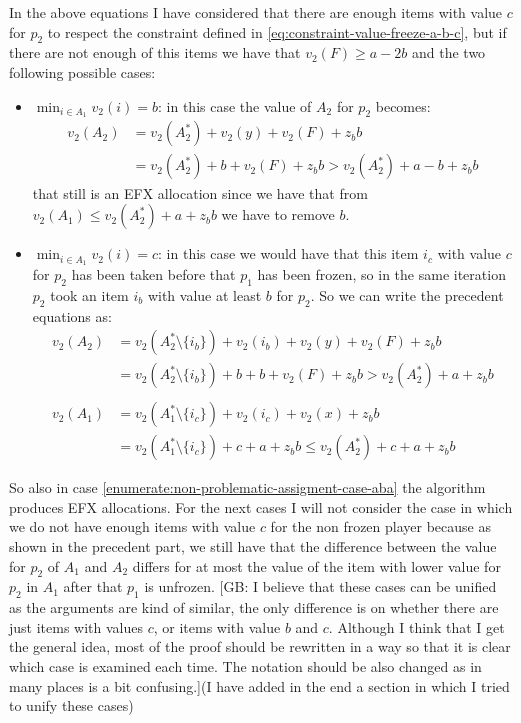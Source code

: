 \documentclass{article}
\newcommand{\gb}[1]{{\color{red}[GB: #1]}}
\begin{document}
In the above equations I have considered that there are enough items with value $c$ for $p_2$ to respect the constraint defined in \ref{eq:constraint-value-freeze-a-b-c}, but if there are not enough of this items we have that $v_2(F) \ge a-2b$ and the two following possible cases:
\begin{itemize}
        \item $\min_{i\in A_1} v_2(i) = b$: in this case the value of $A_2$ for $p_2$ becomes:
        \begin{align*}
            v_2(A_2) &= v_2(A_2^*) + v_2(y) + v_2(F) + z_b b \\
            &= v_2(A_2^*) + b + v_2(F) + z_bb > v_2(A_2^*) + a-b + z_b b
        \end{align*}
       that still is an EFX allocation since we have that from $v_2(A_1) \le v_2(A_2^*) + a + z_bb$ we have to remove $b$.
        \item $\min_{i\in A_1} v_2(i) = c$: in this case we would have that this item $i_c$ with value $c$ for $p_2$ has been taken before that $p_1$ has been frozen, so in the same iteration $p_2$ took an item $i_b$ with value at least $b$ for $p_2$. So we can write the precedent equations as:
        \begin{align*}
            v_2(A_2) &= v_2(A_2^*\setminus{\{i_b\}}) + v_2(i_b) + v_2(y) + v_2(F) + z_b b \\
            &= v_2(A_2^*\setminus{\{i_b\}}) + b + b + v_2(F) + z_bb  > v_2(A_2^*) + a + z_b b\\\\
            v_2(A_1) &= v_2(A_1^*\setminus{\{i_c\}}) + v_2(i_c)+ v_2(x) + z_bb  \\
            &=v_2(A_1^*\setminus{\{i_c\}}) + c  + a + z_bb \le v_2(A_2^*) + c + a + z_bb 
        \end{align*}
\end{itemize}
So also in case \ref{enumerate:non-problematic-assigment-case-aba} the algorithm produces EFX allocations. For the next cases I will not consider the case in which we do not have enough items with value $c$ for the non frozen player because as shown in the precedent part, we still have that the difference between the value for $p_2$ of $A_1$ and $A_2$ differs for at most the value of the item with lower value for $p_2$ in $A_1$ after that $p_1$ is unfrozen.
\gb{I believe that these cases can be unified as the arguments are kind of similar, the only difference is on whether there are just items with values $c$, or items with value $b$ and $c$. Although I think that I get the general idea, most of the proof should be rewritten in a way so that it is clear which case is examined each time. The notation should be also changed as in many places is a bit confusing.}(I have added in the end a section in which I tried to unify these cases)
\end{document}
